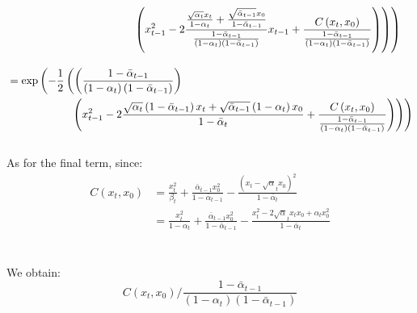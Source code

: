 \documentclass[twoside]{article}
\numberwithin{equation}{section}
\numberwithin{figure}{section}
\begin{document}
\begin{align}
  &\hspace{4cm} \left. \left. \left(x_{t-1}^2 - 2 \frac{\frac{\sqrt{\alpha_t}x_t}{1 - \alpha_t} + \frac{\sqrt{\bar{\alpha}_{t-1}} x_0}{1 - \bar{\alpha}_{t-1}}}{\frac{1 - \bar{\alpha}_{t-1}}{\left(1 - \alpha_t\right)\left(1 - \bar{\alpha}_{t-1}\right)}} x_{t-1} + \frac{C\left(x_t, x_0\right)}{\frac{1 - \bar{\alpha}_{t-1}}{\left(1 - \alpha_t\right)\left(1 - \bar{\alpha}_{t-1}\right)}}\right) \right) \right) \notag \\[10pt]
  &= \exp \left(- \frac{1}{2} \left( \left(\frac{1 - \bar{\alpha}_{t-1}}{\left(1 - \alpha_t\right)\left(1 - \bar{\alpha}_{t-1}\right)}\right)  \right. \right. \\
  &\hspace{2cm} \left. \left. \left(x_{t-1}^2 - 2 \frac{\sqrt{\alpha_t} \left(1 - \bar{\alpha}_{t-1}\right) x_t + \sqrt{\bar{\alpha}_{t-1}}\left(1 - \alpha_t\right) x_0}{1 - \bar{\alpha}_t} + \frac{C\left(x_t, x_0\right)}{\frac{1 - \bar{\alpha}_{t-1}}{\left(1 - \alpha_t\right)\left(1 - \bar{\alpha}_{t-1}\right)}}\right) \right) \right) \notag 
\end{align}
\\
As for the final term, since:
\begin{align}
  C \left(x_t, x_0\right) &= \frac{x_t^2}{\beta_t} + \frac{\bar{\alpha}_{t-1} x_0^2}{1 - \bar{\alpha}_{t-1}} - \frac{\left(x_t - \sqrt{\alpha}_t x_0\right)^2}{1 - \bar{\alpha}_{t}} \\
  &= \frac{x_t^2}{1 - \alpha_t} + \frac{\bar{\alpha}_{t-1} x_0^2}{1 - \bar{\alpha}_{t-1}} - \frac{x_t^2 - 2 \sqrt{\alpha}_t x_t x_0 + \alpha_t x_0^2}{1 - \bar{\alpha}_{t}}
\end{align}
\\\\
We obtain:
\begin{equation}
  C\left(x_t, x_0\right) / \frac{1 - \bar{\alpha}_{t-1}}{\left(1 - \alpha_t\right)\left(1 - \bar{\alpha}_{t-1}\right)} 
\end{equation}
\end{document}
